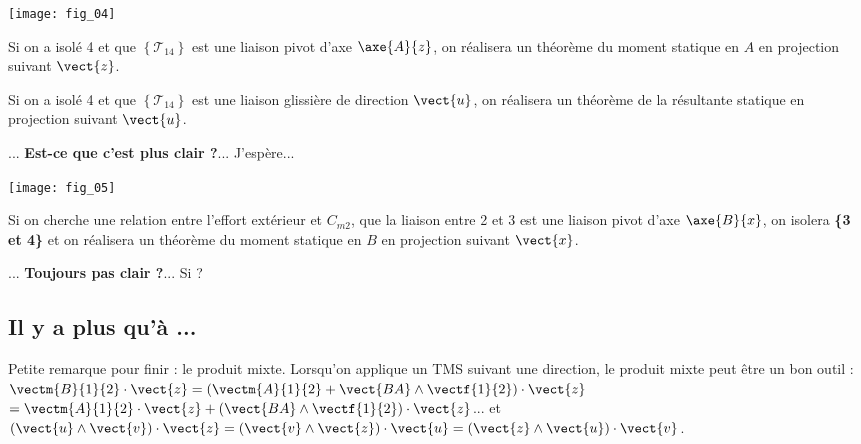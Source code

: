 \begin{minipage}[c]{.4\linewidth}
\begin{center}
\texttt{[image: fig\_04]}
\end{center}
\end{minipage}
\hfill
\begin{minipage}[c]{.55\linewidth}
Si on a isolé 4 et que  $\left\{\mathcal{T}_{14}\right\}$ est une liaison pivot d'axe $\axe{A}{z}$, on réalisera un théorème du moment statique en $A$ en projection suivant $\vect{z}$.

Si on a isolé 4 et que  $\left\{\mathcal{T}_{14}\right\}$ est une liaison glissière de direction $\vect{u}$, on réalisera un théorème de la résultante statique en projection suivant $\vect{u}$.

... \textbf{Est-ce que c'est plus clair ?}... J'espère...

\end{minipage}



\begin{minipage}[c]{.4\linewidth}
\begin{center}
\texttt{[image: fig\_05]}
\end{center}
\end{minipage}
\hfill
\begin{minipage}[c]{.55\linewidth}
Si on cherche une relation entre l'effort extérieur et $C_{m2}$, que la liaison entre 2 et 3 est une liaison pivot d'axe 
$\axe{B}{x}$, on isolera \textbf{\{3 et 4\}} et on réalisera un théorème du moment statique en $B$ en projection suivant $\vect{x}$.

... \textbf{Toujours pas clair ?}... Si ?

\end{minipage}


\subsection{Il y a plus qu'à ...}

Petite remarque pour finir : le produit mixte. Lorsqu'on applique un TMS suivant une direction, le produit mixte peut être un bon outil :
$\vectm{B}{1}{2}\cdot \vect{z} = \left( \vectm{A}{1}{2} + \vect{BA}\wedge \vectf{1}{2}\right)\cdot \vect{z}$
$=  \vectm{A}{1}{2}\cdot \vect{z} + \left(\vect{BA}\wedge \vectf{1}{2}\right)\cdot \vect{z}$...
et $\left(\vect{u} \wedge \vect{v}\right) \cdot \vect{z}= \left(\vect{v} \wedge \vect{z}\right) \cdot \vect{u}= \left(\vect{z} \wedge \vect{u}\right) \cdot \vect{v}$.